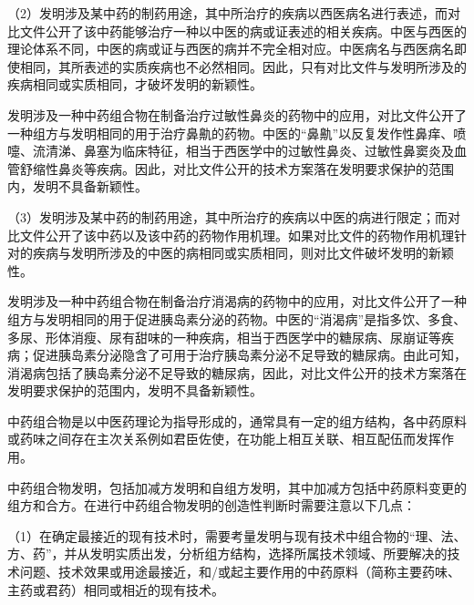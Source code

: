 {\setlength{\parindent}{17.1bp}（2）发明涉及某中药的制药用途，其中所治疗的疾病以西医病名进行表述，而对比文件公开了该中药能够治疗一种以中医的病或证表述的相关疾病。中医与西医的理论体系不同，中医的病或证与西医的病并不完全相对应。中医病名与西医病名即使相同，其所表述的实质疾病也不必然相同。因此，只有对比文件与发明所涉及的疾病相同或实质相同，才破坏发明的新颖性。\par}

{\par}

发明涉及一种中药组合物在制备治疗过敏性鼻炎的药物中的应用，对比文件公开了一种组方与发明相同的用于治疗鼻鼽的药物。中医的“鼻鼽”以反复发作性鼻痒、喷嚏、流清涕、鼻塞为临床特征，相当于西医学中的过敏性鼻炎、过敏性鼻窦炎及血管舒缩性鼻炎等疾病。因此，对比文件公开的技术方案落在发明要求保护的范围内，发明不具备新颖性。

{\setlength{\parindent}{17.1bp}（3）发明涉及某中药的制药用途，其中所治疗的疾病以中医的病进行限定；而对比文件公开了该中药以及该中药的药物作用机理。如果对比文件的药物作用机理针对的疾病与发明所涉及的中医的病相同或实质相同，则对比文件破坏发明的新颖性。\par}

{\par}

发明涉及一种中药组合物在制备治疗消渴病的药物中的应用，对比文件公开了一种组方与发明相同的用于促进胰岛素分泌的药物。中医的“消渴病”是指多饮、多食、多尿、形体消瘦、尿有甜味的一种疾病，相当于西医学中的糖尿病、尿崩证等疾病；促进胰岛素分泌隐含了可用于治疗胰岛素分泌不足导致的糖尿病。由此可知，消渴病包括了胰岛素分泌不足导致的糖尿病，因此，对比文件公开的技术方案落在发明要求保护的范围内，发明不具备新颖性。

中药组合物是以中医药理论为指导形成的，通常具有一定的组方结构，各中药原料或药味之间存在主次关系例如君臣佐使，在功能上相互关联、相互配伍而发挥作用。

中药组合物发明，包括加减方发明和自组方发明，其中加减方包括中药原料变更的组方和合方。在进行中药组合物发明的创造性判断时需要注意以下几点：

{\setlength{\parindent}{17.1bp}（1）在确定最接近的现有技术时，需要考量发明与现有技术中组合物的“理、法、方、药”，并从发明实质出发，分析组方结构，选择所属技术领域、所要解决的技术问题、技术效果或用途最接近，和/或起主要作用的中药原料（简称主要药味、主药或君药）相同或相近的现有技术。\par}

